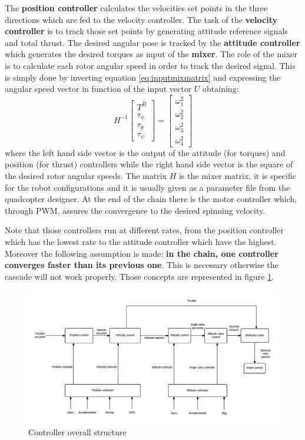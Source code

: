 The \textbf{position controller} calculates the velocities set points in the three directions which are fed to the velocity controller. The task of the \textbf{velocity controller} is to track those set points by generating attitude reference signals and total thrust. The desired angular pose is tracked by the \textbf{attitude controller} which generates the desired torques as input of the \textbf{mixer}. The role of the mixer is to calculate each rotor angular speed in order to track the desired signal. This is simply done by inverting equation \ref{eq:inputmixmatrix} and expressing the angular speed vector in function of the input vector $U$ obtaining:\begin{equation}
H^{-1}\begin{bmatrix}
T^B\\\tau_\phi\\\tau_\theta\\\tau_\psi
\end{bmatrix} = \begin{bmatrix}
\omega_1^2\\\omega_2^2\\\omega_3^2\\\omega_4^2
\end{bmatrix}
\end{equation}
where the left hand side vector is the output of the attitude (for torques) and position (for thrust) controllers while the right hand side vector is the square of the desired rotor angular speeds. The matrix $H$ is the mixer matrix, it is specific for the robot configurations and it is usually given as a parameter file from the quadcopter designer. At the end of the chain there is the motor controller which, through PWM, assures the convergence to the desired spinning velocity. 

Note that those controllers run at different rates, from the position controller which has the lowest rate to the attitude controller which have the highest. Moreover the following assumption is made: \textbf{in the chain, one controller converges faster than its previous one}. This is necessary otherwise the cascade will not work properly. Those concepts are represented in figure \ref{figure:controlarch}.

\begin{figure}[h]
	\centering
	\noindent
	\includegraphics[width=1\textwidth]{control_arch.png}
	\caption{Controller overall structure}
	\label{figure:controlarch}
\end{figure}


